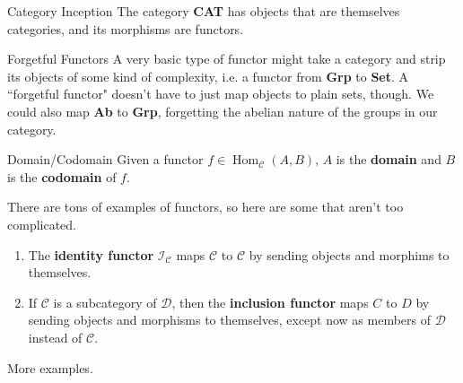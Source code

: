 \documentclass[10pt]{report}
\DeclareMathOperator{\hh}{Hom}
\begin{document}
\begin{ex}{Category Inception}{}
The category \textbf{CAT} has objects that are themselves categories, and its morphisms are functors.
\end{ex}

\begin{ex}{Forgetful Functors}{}
A very basic type of functor might take a category and strip its objects of some kind of complexity, i.e. a functor from \textbf{Grp} to \textbf{Set}. A ``forgetful functor" doesn't have to just map objects to plain sets, though. We could also map \textbf{Ab} to \textbf{Grp}, forgetting the abelian nature of the groups in our category.
\end{ex}

\begin{defn}{Domain/Codomain}{}
	Given a functor $f \in \hh_{\mathscr{C}}(A,B)$, $A$ is the \textbf{domain} and $B$ is the \textbf{codomain} of $f$.
\end{defn}

There are tons of examples of functors, so here are some that aren't too complicated.
\begin{enumerate}
	\item The \textbf{identity functor} $\mathcal{I}_{\mathscr{C}}$ maps $\mathscr{C}$ to $\mathscr{C}$ by sending objects and morphims to themselves.
	\item If $\mathscr{C}$ is a subcategory of $\mathscr{D}$, then the \textbf{inclusion functor} maps $C$ to $D$ by sending objects and morphisms to themselves, except now as members of $\mathscr{D}$ instead of $\mathscr{C}$.
\end{enumerate}

{\color{red}More examples.}
\end{document}
